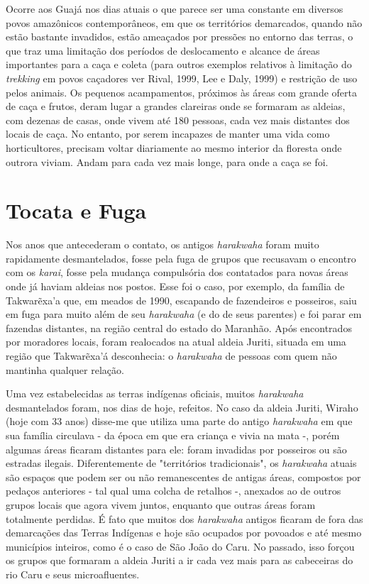Ocorre aos Guajá nos dias atuais o que parece ser uma constante em
diversos povos amazônicos contemporâneos, em que os territórios
demarcados, quando não estão bastante invadidos, estão ameaçados por
pressões no entorno das terras, o que traz uma limitação dos períodos de
deslocamento e alcance de áreas importantes para a caça e coleta (para
outros exemplos relativos à limitação do \emph{trekking} em povos
caçadores ver Rival, 1999, Lee e Daly, 1999) e restrição de uso pelos
animais. Os pequenos acampamentos, próximos às áreas com grande oferta
de caça e frutos, deram lugar a grandes clareiras onde se formaram as
aldeias, com dezenas de casas, onde vivem até 180 pessoas, cada vez mais
distantes dos locais de caça. No entanto, por serem incapazes de manter
uma vida como horticultores, precisam voltar diariamente ao mesmo
interior da floresta onde outrora viviam. Andam para cada vez mais
longe, para onde a caça se foi.

\section{Tocata e Fuga}

Nos anos que antecederam o contato, os antigos \emph{harakwaha} foram
muito rapidamente desmantelados, fosse pela fuga de grupos que recusavam
o encontro com os \emph{karai}, fosse pela mudança compulsória dos
contatados para novas áreas onde já haviam aldeias nos postos. Esse foi
o caso, por exemplo, da família de Takwarẽxa'a que, em meados de 1990,
escapando de fazendeiros e posseiros, saiu em fuga para muito além de
seu \emph{harakwaha} (e do de seus parentes) e foi parar em fazendas
distantes, na região central do estado do Maranhão. Após encontrados por
moradores locais, foram realocados na atual aldeia Juriti, situada em
uma região que Takwarẽxa'á desconhecia: o \emph{harakwaha} de pessoas
com quem não mantinha qualquer relação.

Uma vez estabelecidas as terras indígenas oficiais, muitos
\emph{harakwaha} desmantelados foram, nos dias de hoje, refeitos. No
caso da aldeia Juriti, Wiraho (hoje com 33 anos) disse-me que utiliza
uma parte do antigo \emph{harakwaha} em que sua família circulava - da
época em que era criança e vivia na mata -, porém algumas áreas ficaram
distantes para ele: foram invadidas por posseiros ou são estradas
ilegais. Diferentemente de "territórios tradicionais", os
\emph{harakwaha} atuais são espaços que podem ser ou não remanescentes
de antigas áreas, compostos por pedaços anteriores - tal qual uma colcha
de retalhos -, anexados ao de outros grupos locais que agora vivem
juntos, enquanto que outras áreas foram totalmente perdidas. É fato que
muitos dos \emph{harakwaha} antigos ficaram de fora das demarcações das
Terras Indígenas e hoje são ocupados por povoados e até mesmo municípios
inteiros, como é o caso de São João do Caru. No passado, isso forçou os
grupos que formaram a aldeia Juriti a ir cada vez mais para as
cabeceiras do rio Caru e seus microafluentes.

